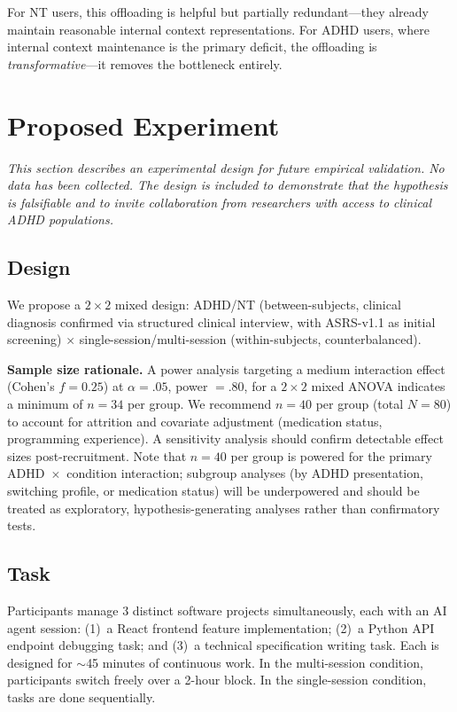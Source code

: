 \documentclass[sigconf,nonacm]{acmart}
\begin{document}
For NT users, this offloading is helpful but partially redundant---they already maintain reasonable internal context representations. For ADHD users, where internal context maintenance is the primary deficit, the offloading is \emph{transformative}---it removes the bottleneck entirely.

\section{Proposed Experiment}
\label{sec:experiment}

\textit{This section describes an experimental design for future empirical validation. No data has been collected. The design is included to demonstrate that the hypothesis is falsifiable and to invite collaboration from researchers with access to clinical ADHD populations.}

\subsection{Design}

We propose a $2 \times 2$ mixed design: ADHD/NT (between-subjects, clinical diagnosis confirmed via structured clinical interview, with ASRS-v1.1 as initial screening) $\times$ single-session/multi-session (within-subjects, counterbalanced).

\textbf{Sample size rationale.} A power analysis targeting a medium interaction effect (Cohen's $f = 0.25$) at $\alpha = .05$, power $= .80$, for a $2 \times 2$ mixed ANOVA indicates a minimum of $n = 34$ per group. We recommend $n = 40$ per group (total $N = 80$) to account for attrition and covariate adjustment (medication status, programming experience). A sensitivity analysis should confirm detectable effect sizes post-recruitment. Note that $n = 40$ per group is powered for the primary ADHD~$\times$~condition interaction; subgroup analyses (by ADHD presentation, switching profile, or medication status) will be underpowered and should be treated as exploratory, hypothesis-generating analyses rather than confirmatory tests.

\subsection{Task}

Participants manage 3 distinct software projects simultaneously, each with an AI agent session: (1)~a React frontend feature implementation; (2)~a Python API endpoint debugging task; and (3)~a technical specification writing task. Each is designed for $\sim$45 minutes of continuous work. In the multi-session condition, participants switch freely over a 2-hour block. In the single-session condition, tasks are done sequentially.
\end{document}
